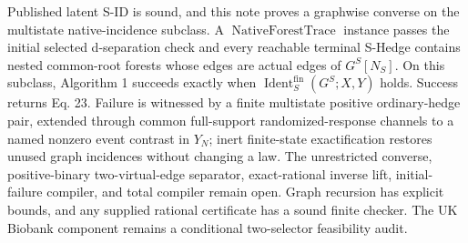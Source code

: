 Published latent S-ID is sound, and this note proves a graphwise converse on the multistate native-incidence subclass. A \(\operatorname{NativeForestTrace}\) instance passes the initial selected d-separation check and every reachable terminal S-Hedge contains nested common-root forests whose edges are actual edges of \(G^S[N_S]\). On this subclass, Algorithm 1 succeeds exactly when \(\operatorname{Ident}^{\mathrm{fin}}_S(G^S;X,Y)\) holds. Success returns Eq. 23. Failure is witnessed by a finite multistate positive ordinary-hedge pair, extended through common full-support randomized-response channels to a named nonzero event contrast in \(Y_N\); inert finite-state exactification restores unused graph incidences without changing a law. The unrestricted converse, positive-binary two-virtual-edge separator, exact-rational inverse lift, initial-failure compiler, and total compiler remain open. Graph recursion has explicit bounds, and any supplied rational certificate has a sound finite checker. The UK Biobank component remains a conditional two-selector feasibility audit.
